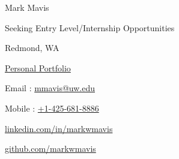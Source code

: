 \begin{center}
{\Huge Mark Mavis}\par
\large Seeking Entry Level/Internship Opportunities
\bigskip

\begin{minipage}[b]{0.33333\textwidth}
\raggedright
Redmond, WA \par
\href{www.google.com}{Personal Portfolio}
\end{minipage}%
\begin{minipage}[b]{0.33333\textwidth}
\centering
Email : \href{mailto:mmavis@uw.edu}{mmavis@uw.edu} \par
Mobile : \href{tel:+14256818886}{+1-425-681-8886}
\end{minipage}%
\begin{minipage}[b]{0.33333\textwidth}
\raggedleft
\href{https://www.linkedin.com/in/markwmavis/}{linkedin.com/in/markwmavis} \par
\href{https://www.github.com/in/markwmavis/}{github.com/markwmavis}
\end{minipage}
\end{center}